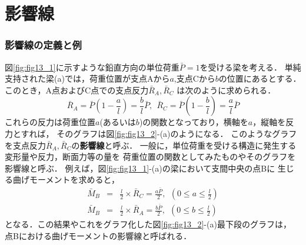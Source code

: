 \documentclass[10pt,a4j]{jbook}
\newlength{\minitwocolumn}
\begin{document}
\newcommand{\fat}[1]{\mbox{\boldmath $#1$}}
\newcommand{\D}{\partial}
\newcommand{\w}{\omega}
\newcommand{\ga}{\alpha}
\newcommand{\gb}{\beta}
\newcommand{\gx}{\xi}
\newcommand{\gz}{\zeta}
\newcommand{\vhat}[1]{\hat{\fat{#1}}}
\newcommand{\spc}{\vspace{0.7\baselineskip}}
\newcommand{\halfspc}{\vspace{0.3\baselineskip}}

\newcommand{\twofig}[2]
 {
   \begin{figure}
     \begin{minipage}[t]{\minitwocolumn}
         \begin{center}   #1
         \end{center}
     \end{minipage}
         \hspace{\columnsep}
     \begin{minipage}[t]{\minitwocolumn}
         \begin{center} #2
         \end{center}
     \end{minipage}
   \end{figure}
 }
\setcounter{chapter}{9}
\chapter{影響線}
\subsection{影響線の定義と例}
図\ref{fig:fig13_1}に示すような鉛直方向の単位荷重$\bar P=1$を受ける梁を考える．
単純支持された梁(a)では，荷重位置が支点Aから$a$,支点Cから$b$の位置にあるとする．
このとき，A点およびC点での支点反力$\bar{R}_A,\bar{R}_C$
は次のように求められる．
\begin{equation}
	\bar R_A =  \bar{P}\left( 1-\frac{a}{l}\right)
	=
	\frac{b}{l}
	\bar{P}
	, \ \ 
	\bar R_C =  \bar{P}\left( 1-\frac{b}{l}\right)
	= \frac{a}{l} \bar{P}
	\label{eqn:Rbar_1}
\end{equation}
これらの反力は荷重位置$a$(あるいは$b$)の関数となっており，横軸を$a$，縦軸を反力とすれば，
そのグラフは図\ref{fig:fig13_2}-(a)のようになる．
このようなグラフを支点反力$\bar{R}_A,\bar{R}_C$の{\bf 影響線}と呼ぶ．
一般に，単位荷重を受ける構造に発生する変形量や反力，断面力等の量を
荷重位置の関数としてみたものやそのグラフを影響線と呼ぶ．
例えば，図\ref{fig:fig13_1}-(a)の梁において支間中央の点Bに
生じる曲げモーメントを求めると，
\begin{eqnarray}
	\bar{M}_B &=& \frac{l}{2}\times \bar{R}_C=\frac{a\bar P }{2}
	, \ \ \left( 0 \leq a \leq \frac{l}{2} \right) \\
	\bar{M}_B &=& \frac{l}{2}\times \bar{R}_A=\frac{b\bar P }{2}
	, \ \ \left( 0 \leq b \leq \frac{l}{2} \right) 
\end{eqnarray}
となる．この結果やこれをグラフ化した図\ref{fig:fig13_2}-(a)最下段のグラフは，
点Bにおける曲げモーメントの影響線と呼ばれる．
\end{document}
